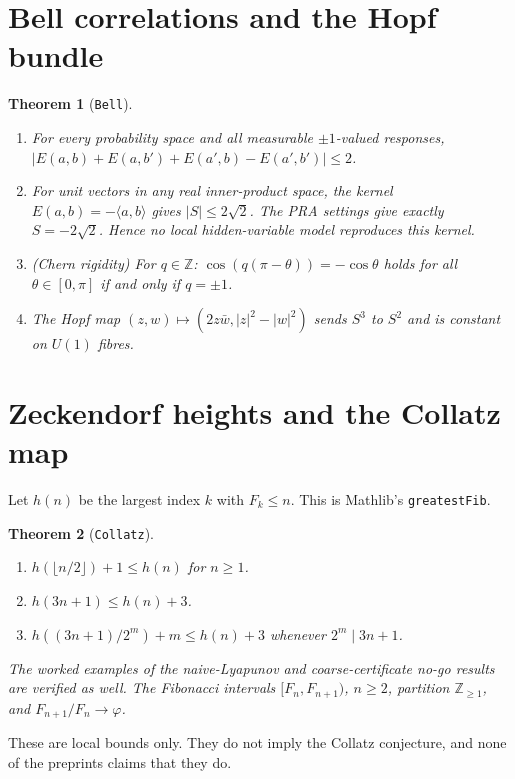 \documentclass[11pt]{article}
\newtheorem{theorem}{Theorem}[section]
\theoremstyle{remark}
\newcommand{\lean}[1]{\texttt{#1}}
\begin{document}
\section{Bell correlations and the Hopf bundle}
\begin{theorem}[\lean{Bell}]
\begin{enumerate}
\item For every probability space and all measurable $\pm1$-valued responses,
$|E(a,b)+E(a,b')+E(a',b)-E(a',b')|\le2$.
\item For unit vectors in any real inner-product space, the kernel
$E(a,b)=-\langle a,b\rangle$ gives $|S|\le2\sqrt2$. The PRA settings give exactly
$S=-2\sqrt2$. Hence no local hidden-variable model reproduces this kernel.
\item (Chern rigidity) For $q\in\mathbb Z$: $\cos(q(\pi-\theta))=-\cos\theta$ holds for all
$\theta\in[0,\pi]$ if and only if $q=\pm1$.
\item The Hopf map $(z,w)\mapsto(2z\bar w,|z|^2-|w|^2)$ sends $S^3$ to $S^2$ and is
constant on $U(1)$ fibres.
\end{enumerate}
\end{theorem}

\section{Zeckendorf heights and the Collatz map}
Let $h(n)$ be the largest index $k$ with $F_k\le n$. This is Mathlib's \lean{greatestFib}.
\begin{theorem}[\lean{Collatz}]
\begin{enumerate}
\item $h(\lfloor n/2\rfloor)+1\le h(n)$ for $n\ge1$.
\item $h(3n+1)\le h(n)+3$.
\item $h((3n+1)/2^m)+m\le h(n)+3$ whenever $2^m\mid 3n+1$.
\end{enumerate}
The worked examples of the naive-Lyapunov and coarse-certificate no-go results are verified
as well. The Fibonacci intervals $[F_n,F_{n+1})$, $n\ge2$, partition $\mathbb Z_{\ge1}$, and
$F_{n+1}/F_n\to\varphi$.
\end{theorem}
These are local bounds only. They do not imply the Collatz conjecture, and none of the
preprints claims that they do.
\end{document}
